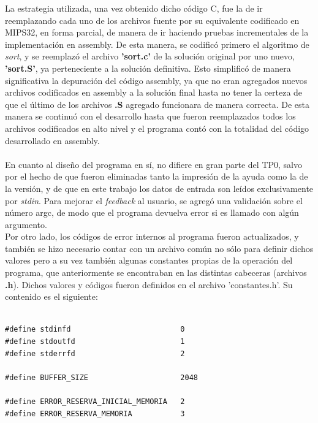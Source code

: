 \documentclass[a4paper,10pt]{article}
\begin{document}
La estrategia utilizada, una vez obtenido dicho c\'odigo C, fue la de ir reemplazando cada uno de los archivos fuente por su equivalente codificado en MIPS32, en forma parcial, de manera de ir haciendo pruebas incrementales de la implementaci\'on en assembly. De esta manera, se codific\'o primero el algoritmo de \textit{sort}, y se reemplaz\'o el archivo \textbf{'sort.c'} de la soluci\'on original por uno nuevo, \textbf{'sort.S'}, ya perteneciente a la soluci\'on definitiva. Esto simplific\'o de manera significativa la depuraci\'on del c\'odigo assembly, ya que no eran agregados nuevos archivos codificados en assembly a la soluci\'on final hasta no tener la certeza de que el \'ultimo de los archivos \textbf{.S} agregado funcionara de manera correcta. De esta manera se continu\'o con el desarrollo hasta que fueron reemplazados todos los archivos codificados en alto nivel y el programa cont\'o con la totalidad del c\'odigo desarrollado en assembly.\\
\\En cuanto al dise\~no del programa en s\'i, no difiere en gran parte del TP0, salvo por el hecho de que fueron eliminadas tanto la impresi\'on de la ayuda como la de la versi\'on, y de que en este trabajo los datos de entrada son le\'idos exclusivamente por \textit{stdin}. Para mejorar el \textit{feedback} al usuario, se agreg\'o una validaci\'on sobre el n\'umero argc, de modo que el programa devuelva error si es llamado con alg\'un argumento.\\
Por otro lado, los c\'odigos de error internos al programa fueron actualizados, y tambi\'en se hizo necesario contar con un archivo com\'un no s\'olo para definir dichos valores pero a su vez tambi\'en algunas constantes propias de la operaci\'on del programa, que anteriormente se encontraban en las distintas cabeceras (archivos \textbf{.h}). Dichos valores y c\'odigos fueron definidos en el archivo 'constantes.h'. Su contenido es el siguiente:\\
\\
{\footnotesize \begin{verbatim}
#define stdinfd							0
#define stdoutfd						1
#define stderrfd						2	

#define BUFFER_SIZE						2048

#define ERROR_RESERVA_INICIAL_MEMORIA	2
#define ERROR_RESERVA_MEMORIA			3
\end{verbatim}}
\end{document}
